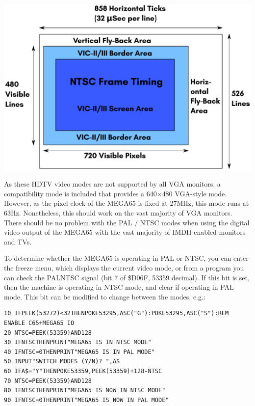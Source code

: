 \includegraphics[width=\linewidth]{images/illustrations/VIC-IV-NTSC-Frame.pdf}

As these HDTV video modes are not supported by all VGA monitors, a compatibility mode is included that provides a 640$\times$480 VGA-style mode. However, as the pixel clock of the MEGA65 is fixed at 27MHz, this mode runs at 63Hz.  Nonetheless, this should work on the vast majority of VGA monitors.  There should be no problem with the PAL / NTSC modes when using the digital video output of the MEGA65 with the vast majority of IMDH\texttrademark-enabled monitors and TVs.

To determine whether the MEGA65 is operating in PAL or NTSC, you can enter the freeze menu, which displays the current video mode, or from a program you can check the PALNTSC signal (bit 7 of \$D06F, 53359 decimal). If this bit is set, then the machine is operating in NTSC mode, and clear if operating in PAL mode. This bit can be modified to change between the modes, e.g.:

\begin{tcolorbox}[colback=black,coltext=white]
\verbatimfont{\codefont}
\begin{verbatim}
10 IFPEEK(53272)<32THENPOKE53295,ASC("G"):POKE53295,ASC("S"):REM ENABLE C65+MEGA65 IO
20 NTSC=PEEK(53359)AND128
30 IFNTSCTHENPRINT"MEGA65 IS IN NTSC MODE"
40 IFNTSC=0THENPRINT"MEGA65 IS IN PAL MODE"
50 INPUT"SWITCH MODES (Y/N)? ",A$
60 IFA$="Y"THENPOKE53359,PEEK(53359)+128-NTSC
70 NTSC=PEEK(53359)AND128
80 IFNTSCTHENPRINT"MEGA65 IS NOW IN NTSC MODE"
90 IFNTSC=0THENPRINT"MEGA65 IS NOW IN PAL MODE"
\end{verbatim}
\end{tcolorbox}

